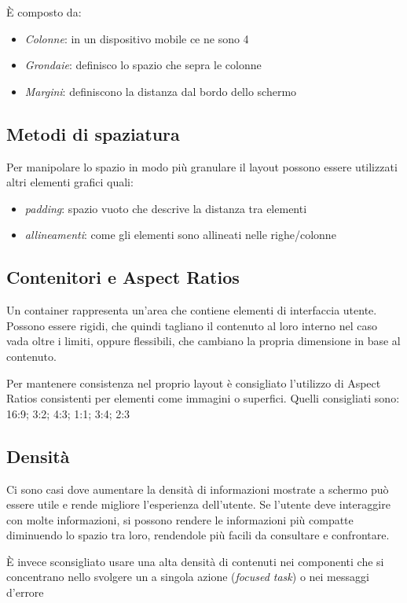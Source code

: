 \documentclass[12pt, a4paper]{report}
\begin{document}
			È composto da:
			\begin{itemize}
				\item \textit{Colonne}: in un dispositivo mobile ce ne sono 4
				\item \textit{Grondaie}: definisco lo spazio che sepra le colonne
				\item \textit{Margini}: definiscono la distanza dal bordo dello schermo
			\end{itemize}
			
		\subsection{Metodi di spaziatura}
			Per manipolare lo spazio in modo più granulare il layout possono essere utilizzati altri elementi grafici quali:
			\begin{itemize}
				\item \textit{padding}: spazio vuoto che descrive la distanza tra elementi
				\item \textit{allineamenti}: come gli elementi sono allineati nelle righe/colonne
			\end{itemize}
			
		\subsection{Contenitori e Aspect Ratios}
			Un container rappresenta un'area che contiene elementi di interfaccia utente.
			Possono essere rigidi, che quindi tagliano il contenuto al loro interno nel caso vada oltre i limiti, oppure flessibili, che cambiano la propria dimensione in base al contenuto.
			
			Per mantenere consistenza nel proprio layout è consigliato l'utilizzo di Aspect Ratios consistenti per elementi come immagini o superfici. Quelli consigliati sono: 16:9; 3:2; 4:3; 1:1; 3:4; 2:3 \cite{layout_containers}
			
		\subsection{Densità}
			Ci sono casi dove aumentare la densità di informazioni mostrate a schermo può essere utile e rende migliore l'esperienza dell'utente.
			Se l'utente deve interaggire con molte informazioni, si possono rendere le informazioni più compatte diminuendo lo spazio tra loro, rendendole più facili da consultare e confrontare.
			
			È invece sconsigliato usare una alta densità di contenuti nei componenti che si concentrano nello svolgere un a singola azione (\textit{focused task}) o nei messaggi d'errore			
\end{document}
